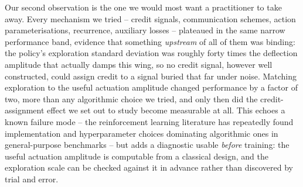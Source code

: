 \documentclass[preprint,11pt]{elsarticle}
\begin{document}
Our second observation is the one we would most want a practitioner to take
away. Every mechanism we tried -- credit signals, communication schemes,
action parameterisations, recurrence, auxiliary losses -- plateaued in the
same narrow performance band, evidence that something \emph{upstream} of
all of them was binding: the policy's exploration standard deviation was
roughly forty times the deflection amplitude that actually damps this wing,
so no credit signal, however well constructed, could assign credit to a
signal buried that far under noise. Matching exploration to the useful
actuation amplitude changed performance by a factor of two, more than any
algorithmic choice we tried, and only then did the credit-assignment effect
we set out to study become measurable at all. This echoes a known failure
mode -- the reinforcement learning literature has repeatedly found
implementation and hyperparameter choices dominating algorithmic ones in
general-purpose benchmarks \cite{henderson2018matters,
engstrom2020implementation,andrychowicz2021what} -- but adds a diagnostic
usable \emph{before} training: the useful actuation amplitude is computable
from a classical design, and the exploration scale can be checked against
it in advance rather than discovered by trial and error.
\end{document}
